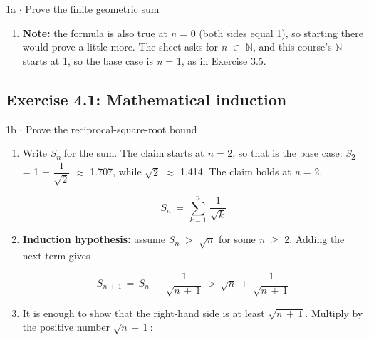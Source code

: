 \documentclass[11pt]{article}
\begin{document}
\begin{keepsection}
\begin{workedbox}{1a \ensuremath{\cdot} Prove the finite geometric sum}
\begin{enumerate}
This is the formula with \textit{n} + 1 in place of \textit{n}, so with the base case it holds for every \textit{n} \ensuremath{\in} \ensuremath{\mathbb{N}}.
\item \textbf{Note:} the formula is also true at \textit{n} = 0 (both sides equal 1), so starting there would prove a little more. The sheet asks for \textit{n} \ensuremath{\in} \ensuremath{\mathbb{N}}, and this course's \ensuremath{\mathbb{N}} starts at 1, so the base case is \textit{n} = 1, as in Exercise 3.5.
\end{enumerate}
\end{workedbox}

\end{keepsection}
\begin{keepsection}\subsection{Exercise 4.1: Mathematical induction}

\begin{workedbox}{1b \ensuremath{\cdot} Prove the reciprocal-square-root bound}
\begin{enumerate}
\item {}
Write \textit{S}\textsubscript{\textit{n}} for the sum. The claim starts at \textit{n} = 2, so that is the base case: \textit{S}\textsubscript{2} = 1 + {\small\ensuremath{\dfrac{1}{\sqrt{2}}}} \ensuremath{\approx} 1.707, while \ensuremath{\sqrt{2}} \ensuremath{\approx} 1.414. The claim holds at \textit{n} = 2.

\begin{equation*}{S}_{{n}}\, =\, \sum_{{k}=1}^{{n}} \, \dfrac{1}{\sqrt{{k}}}\end{equation*}
\item {}
\textbf{Induction hypothesis:} assume \textit{S}\textsubscript{\textit{n}} \ensuremath{>} \ensuremath{\sqrt{{n}}} for some \textit{n} \ensuremath{\geq} 2. Adding the next term gives

\begin{equation*}{S}_{{n}\, +\, 1}\, =\, {S}_{{n}}\, +\, \dfrac{1}{\sqrt{{n}\, +\, 1}}\, >\, \sqrt{{n}}\, +\, \dfrac{1}{\sqrt{{n}\, +\, 1}}\end{equation*}
\item {}
It is enough to show that the right-hand side is at least \ensuremath{\sqrt{{n}\, +\, 1}}. Multiply by the positive number \ensuremath{\sqrt{{n}\, +\, 1}}:


\end{enumerate}
\end{workedbox}
\end{keepsection}
\end{document}
